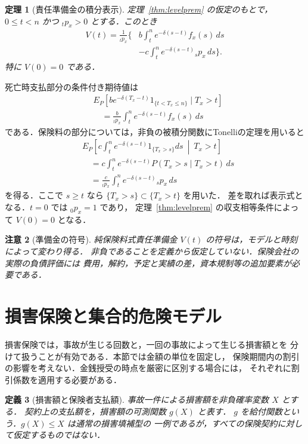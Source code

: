 \documentclass[a5paper,10pt,onecolumn]{jsarticle}
\makeatletter
\theoremstyle{mathnotetheorem}
\newtheorem{theorem}{定理}[section]
\newtheorem{definition}[theorem]{定義}
\newtheorem{remark}[theorem]{注意}
\renewcommand{\proofname}{証明}
\renewenvironment{proof}[1][\proofname]{%
  \par\pushQED{\qed}\normalfont\topsep4\p@\@plus2\p@\relax
  \trivlist\item[\hskip\labelsep\bfseries #1]\ignorespaces
}{\popQED\endtrivlist\@endpefalse}
\makeatother
\begin{document}
\begin{theorem}[責任準備金の積分表示]\label{thm:reserve}
定理~\ref{thm:levelprem} の仮定のもとで，$0\le t<n$ かつ
${}_tp_x>0$ とする．このとき
\[
 \begin{split}
 V(t)=\frac{1}{{}_tp_x}\bigg\{&b\int_t^n
 e^{-\delta(s-t)}f_x(s)\,ds\\
 &-c\int_t^n e^{-\delta(s-t)}{}_sp_x\,ds\bigg\}.
 \end{split}
\]
特に $V(0)=0$ である．
\end{theorem}
\begin{proof}
死亡時支払部分の条件付き期待値は
\begin{align*}
 &E_P[b e^{-\delta(T_x-t)}1_{\{t<T_x\le n\}}\mid T_x>t]\\
 &\quad=\frac{b}{{}_tp_x}\int_t^n e^{-\delta(s-t)}f_x(s)\,ds
\end{align*}
である．保険料の部分については，非負の被積分関数にTonelliの定理を用いると
\begin{align*}
 &E_P\!\left[c\int_t^n e^{-\delta(s-t)}1_{\{T_x>s\}}ds
 \ \middle|\ T_x>t\right]\\
 &\quad=c\int_t^n e^{-\delta(s-t)}
 P(T_x>s\mid T_x>t)\,ds\\
 &\quad=\frac{c}{{}_tp_x}\int_t^n e^{-\delta(s-t)}{}_sp_x\,ds
\end{align*}
を得る．ここで $s\ge t$ なら
$\{T_x>s\}\subset\{T_x>t\}$ を用いた．
差を取れば表示式となる．$t=0$ では ${}_0p_x=1$ であり，
定理~\ref{thm:levelprem} の収支相等条件によって $V(0)=0$ となる．\end{proof}

\begin{remark}[準備金の符号]
純保険料式責任準備金 $V(t)$ の符号は，モデルと時刻によって変わり得る．
非負であることを定義から仮定していない．保険会社の実際の負債評価には
費用，解約，予定と実績の差，資本規制等の追加要素が必要である．
\end{remark}

\section{損害保険と集合的危険モデル}

損害保険では，事故が生じる回数と，一回の事故によって生じる損害額とを
分けて扱うことが有効である．本節では金額の単位を固定し，
保険期間内の割引の影響を考えない．金銭授受の時点を厳密に区別する場合には，
それぞれに割引係数を適用する必要がある．

\begin{definition}[損害額と保険者支払額]
事故一件による損害額を非負確率変数 $X$ とする．
契約上の支払額を，損害額の可測関数 $g(X)$ と表す．
$g$ を\emph{給付関数}という．$g(X)\le X$ は通常の損害填補型の
一例であるが，すべての保険契約に対して仮定するものではない．
\end{definition}
\end{document}
